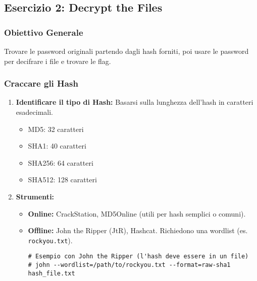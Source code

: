 \subsection{Esercizio 2: Decrypt the Files}
\subsubsection{Obiettivo Generale}
Trovare le password originali partendo dagli hash forniti, poi usare le password per decifrare i file e trovare le flag.

\subsubsection{Craccare gli Hash}
\begin{enumerate}
    \item \textbf{Identificare il tipo di Hash:} Basarsi sulla lunghezza dell'hash in caratteri esadecimali.
    \begin{itemize}
        \item MD5: 32 caratteri
        \item SHA1: 40 caratteri
        \item SHA256: 64 caratteri
        \item SHA512: 128 caratteri
    \end{itemize}
    \item \textbf{Strumenti:}
    \begin{itemize}
        \item \textbf{Online:} CrackStation, MD5Online (utili per hash semplici o comuni).
        \item \textbf{Offline:} John the Ripper (JtR), Hashcat. Richiedono una wordlist (es. \texttt{rockyou.txt}).
        \begin{verbatim}
# Esempio con John the Ripper (l'hash deve essere in un file)
# john --wordlist=/path/to/rockyou.txt --format=raw-sha1 hash_file.txt
        \end{verbatim}
    \end{itemize}
\end{enumerate}

